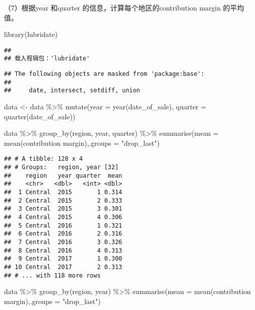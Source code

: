 \documentclass[
]{article}
\newenvironment{Shaded}{\begin{snugshade}}{\end{snugshade}}
\newcommand{\AttributeTok}[1]{\textcolor[rgb]{0.77,0.63,0.00}{#1}}
\newcommand{\FunctionTok}[1]{\textcolor[rgb]{0.00,0.00,0.00}{#1}}
\newcommand{\NormalTok}[1]{#1}
\newcommand{\OtherTok}[1]{\textcolor[rgb]{0.56,0.35,0.01}{#1}}
\newcommand{\SpecialCharTok}[1]{\textcolor[rgb]{0.00,0.00,0.00}{#1}}
\newcommand{\StringTok}[1]{\textcolor[rgb]{0.31,0.60,0.02}{#1}}
\begin{document}
（7）根据year 和quarter 的信息，计算每个地区的contribution margin
的平均值。

\begin{Shaded}
\begin{Highlighting}[]
\FunctionTok{library}\NormalTok{(lubridate)}
\end{Highlighting}
\end{Shaded}

\begin{verbatim}
## 
## 载入程辑包：'lubridate'
\end{verbatim}

\begin{verbatim}
## The following objects are masked from 'package:base':
## 
##     date, intersect, setdiff, union
\end{verbatim}

\begin{Shaded}
\begin{Highlighting}[]
\NormalTok{data }\OtherTok{\textless{}{-}}\NormalTok{ data }\SpecialCharTok{\%\textgreater{}\%}
  \FunctionTok{mutate}\NormalTok{(}\AttributeTok{year =} \FunctionTok{year}\NormalTok{(date\_of\_sale), }\AttributeTok{quarter =} \FunctionTok{quarter}\NormalTok{(date\_of\_sale))}

\NormalTok{data }\SpecialCharTok{\%\textgreater{}\%}
  \FunctionTok{group\_by}\NormalTok{(region, year, quarter) }\SpecialCharTok{\%\textgreater{}\%}
  \FunctionTok{summarise}\NormalTok{(}\AttributeTok{mean =} \FunctionTok{mean}\NormalTok{(}\StringTok{\textasciigrave{}}\AttributeTok{contribution margin}\StringTok{\textasciigrave{}}\NormalTok{),}\AttributeTok{.groups =} \StringTok{"drop\_last"}\NormalTok{)}
\end{Highlighting}
\end{Shaded}

\begin{verbatim}
## # A tibble: 128 x 4
## # Groups:   region, year [32]
##    region   year quarter  mean
##    <chr>   <dbl>   <int> <dbl>
##  1 Central  2015       1 0.314
##  2 Central  2015       2 0.333
##  3 Central  2015       3 0.301
##  4 Central  2015       4 0.306
##  5 Central  2016       1 0.321
##  6 Central  2016       2 0.316
##  7 Central  2016       3 0.326
##  8 Central  2016       4 0.313
##  9 Central  2017       1 0.300
## 10 Central  2017       2 0.313
## # ... with 118 more rows
\end{verbatim}

\begin{Shaded}
\begin{Highlighting}[]
\NormalTok{data }\SpecialCharTok{\%\textgreater{}\%}
  \FunctionTok{group\_by}\NormalTok{(region, year) }\SpecialCharTok{\%\textgreater{}\%}
  \FunctionTok{summarise}\NormalTok{(}\AttributeTok{mean =} \FunctionTok{mean}\NormalTok{(}\StringTok{\textasciigrave{}}\AttributeTok{contribution margin}\StringTok{\textasciigrave{}}\NormalTok{),}\AttributeTok{.groups =} \StringTok{"drop\_last"}\NormalTok{)}
\end{Highlighting}
\end{Shaded}
\end{document}
